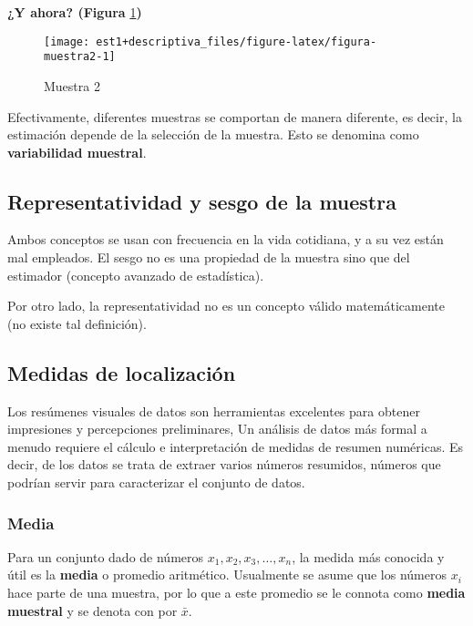 \documentclass[
]{book}
\begin{document}
\textbf{¿Y ahora? (Figura} \ref{fig:figura-muestra2}\textbf{)}

\begin{figure}

{\centering \texttt{[image: est1+descriptiva\_files/figure-latex/figura-muestra2-1]} 

}

\caption{Muestra 2}\label{fig:figura-muestra2}
\end{figure}

Efectivamente, diferentes muestras se comportan de manera diferente, es decir, la estimación depende de la selección de la muestra. Esto se denomina como \textbf{variabilidad muestral}.

\hypertarget{representatividad-y-sesgo-de-la-muestra}{%
\subsection{Representatividad y sesgo de la muestra}\label{representatividad-y-sesgo-de-la-muestra}}

Ambos conceptos se usan con frecuencia en la vida cotidiana, y a su vez están mal empleados. El sesgo no es una propiedad de la muestra sino que del estimador (concepto avanzado de estadística).

Por otro lado, la representatividad no es un concepto válido matemáticamente (no existe tal definición).

\hypertarget{medidas-de-localizaciuxf3n}{%
\subsection{Medidas de localización}\label{medidas-de-localizaciuxf3n}}

Los resúmenes visuales de datos son herramientas excelentes para obtener impresiones y percepciones preliminares, Un análisis de datos más formal a menudo requiere el cálculo e interpretación de medidas de resumen numéricas. Es decir, de los datos se trata de extraer varios números resumidos, números que podrían servir para caracterizar el conjunto de datos.

\hypertarget{media}{%
\subsubsection*{Media}\label{media}}

Para un conjunto dado de números \(x_1, x_2, x_3, \ldots, x_n\), la medida más conocida y útil es la \textbf{media} o promedio aritmético. Usualmente se asume que los números \(x_i\) hace parte de una muestra, por lo que a este promedio se le connota como \textbf{media muestral} y se denota con por \(\bar{x}\).
\end{document}
